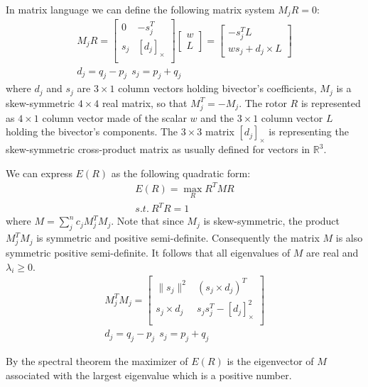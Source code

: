 \documentclass{birkjour}
\numberwithin{equation}{section}
\begin{document}
In matrix language we can define the following matrix system $M_j R = 0$:
\begin{eqnarray}
	M_j R =
	\left[\begin{array}{cc}
		0      &       -s_j^T \\
		s_j    &   \left[ d_j \right]_\times \\
	\end{array}\right]
	\left[\begin{array}{c} 
		w \\
		L
	\end{array}\right] = 
	\left[\begin{array}{c}
		-s_j^T L \\
		w s_j + d_j \times L 
	\end{array}\right]\\
	d_j = q_j - p_j \ \ s_j = p_j + q_j  \nonumber
\end{eqnarray}
where $d_j$ and $s_j$ are $3 \times 1$ column vectors holding bivector's coefficients, $M_j$ is a skew-symmetric $4\times 4$ real matrix, so that $M_j^T = -M_j$. The rotor $R$ is represented as $4 \times 1$ column vector made of the scalar $w$ and the $3 \times 1$ column vector $L$ holding the bivector's components. The $3\times 3$ matrix $\left[ d_j \right]_\times$ is representing the skew-symmetric cross-product matrix as usually defined for vectors in $\mathbb R^3$.

We can express $E(R)$ as the following quadratic form:
\begin{eqnarray}
E(R) = \max_R R^T M R\\
s.t. \ R^T R = 1  \nonumber
\end{eqnarray}
where $M = \sum_j^n { c_j M_j^T M_j}$. Note that since $M_j$ is skew-symmetric, the product $M_j^T M_j$ is symmetric and positive semi-definite.
Consequently the matrix $M$ is also symmetric positive semi-definite. It follows that all eigenvalues of $M$ are real and $\lambda_i \geq 0$.
\begin{eqnarray}
	M_j^T M_j = 
	\left[\begin{array}{cc}
		\| s_j \|^2       &         (s_j \times d_j)^T \\
		s_j \times d_j  &    s_j s_j^T - \left[ d_j \right]^2_\times \\
	\end{array}\right]\\
	d_j = q_j - p_j \ \ s_j = p_j + q_j  \nonumber
\end{eqnarray}

By the spectral theorem the maximizer of $E(R)$ is the eigenvector of $M$ associated with the largest eigenvalue which is a positive number.
\end{document}
